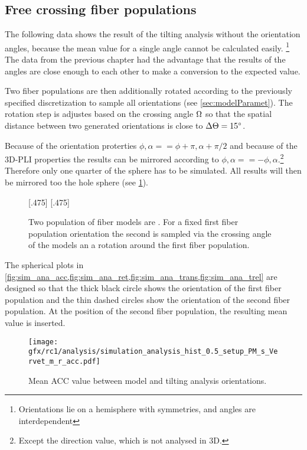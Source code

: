\subsection{Free crossing fiber populations}
\label{sec:resFreeCross}
%
The following data shows the result of the tilting analysis without the orientation angles, because the mean value for a single angle cannot be calculated easily. \footnote{Orientations lie on a hemisphere with symmetries, and angles are interdependent}
The data from the previous chapter had the advantage that the results of the angles are close enough to each other to make a conversion to the expected value.
\par
% 
Two fiber populations are then additionally rotated according to the previously specified discretization to sample all orientations (see \cref{sec:modelParamet}).
The rotation step is adjustes based on the crossing angle $\textnormal{$\Omega$}$ so that the spatial distance between two generated orientations is close to $\Delta \textnormal{$\Theta$} = \SI{15}{\degree}$.

Because of the orientation proterties $\phi,\alpha == \phi+\pi,\alpha+\pi/2$ and because of the \ac{3D-PLI} properties the results can be mirrored according to $\phi,\alpha == -\phi,\alpha$.\footnote{Except the direction value, which is not analysed in 3D.}
Therefore only one quarter of the sphere has to be simulated. 
All results will then be mirrored too the hole sphere (see \cref{fig:simModelSphereSample}).
\par
% 
\begin{figure}[t]
\centering
\setlength{\tikzwidth}{0.40\textwidth}
[.475\textwidth]{}
\hfill
{}
[.475\textwidth]{}
\caption{Two population of fiber models are \dummy{}. For a fixed first fiber population orientation the second is sampled via the crossing angle of the models an a rotation around the first fiber population.}
\label{fig:simModelSphereSample}
\end{figure}
%
The spherical plots in \cref{fig:sim_ana_acc,fig:sim_ana_ret,fig:sim_ana_trans,fig:sim_ana_trel} are designed so that the thick black circle shows the orientation of the first fiber population and the thin dashed circles show the orientation of the second fiber population.
At the position of the second fiber population, the resulting mean value is inserted.
%
%
%
\begin{figure}[!p]
\centering
\texttt{[image: gfx/rc1/analysis/simulation\_analysis\_hist\_0.5\_setup\_PM\_s\_Vervet\_m\_r\_acc.pdf]}
\caption{Mean \ac{ACC} value between model and tilting analysis orientations. }
\label{fig:sim_ana_acc}
\end{figure}
%
